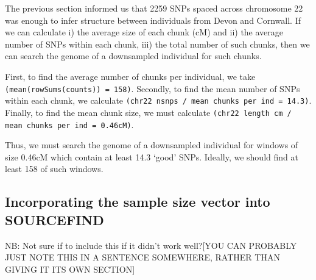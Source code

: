 The previous section informed us that 2259 SNPs spaced across chromosome 22 was enough to infer structure between individuals from Devon and Cornwall. If we can calculate i) the average size of each chunk (cM) and ii) the average number of SNPs within each chunk, iii) the total number of such chunks, then we can search the genome of a downsampled individual for such chunks.

First, to find the average number of chunks per individual, we take \texttt{(mean(rowSums(counts)) = 158)}. Secondly, to find the mean number of SNPs within each chunk, we calculate \texttt{(chr22 nsnps / mean chunks per ind = 14.3)}. Finally, to find the mean chunk size, we must calculate \texttt{(chr22 length cm / mean chunks per ind = 0.46cM)}.

Thus, we must search the genome of a downsampled individual for windows of size 0.46cM which contain at least 14.3 `good' SNPs. Ideally, we should find at least 158 of such windows. 


\subsection{Incorporating the sample size vector into SOURCEFIND}

NB: Not sure if to include this if it didn't work well?{\color{red}[YOU CAN PROBABLY JUST NOTE THIS IN A SENTENCE SOMEWHERE, RATHER THAN GIVING IT ITS OWN SECTION]}